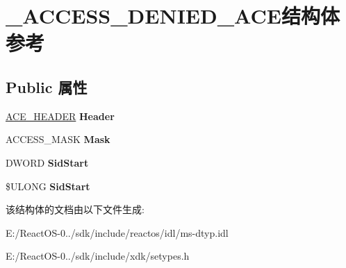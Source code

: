 \hypertarget{struct___a_c_c_e_s_s___d_e_n_i_e_d___a_c_e}{}\section{\+\_\+\+A\+C\+C\+E\+S\+S\+\_\+\+D\+E\+N\+I\+E\+D\+\_\+\+A\+C\+E结构体 参考}
\label{struct___a_c_c_e_s_s___d_e_n_i_e_d___a_c_e}
\subsection*{Public 属性}
\begin{DoxyCompactItemize}
\item 
\mbox{\label{struct___a_c_c_e_s_s___d_e_n_i_e_d___a_c_e_aa7c23bffe145af1dc4b7fca6fd3ef57d}} 
\hyperlink{struct___a_c_e___h_e_a_d_e_r}{A\+C\+E\+\_\+\+H\+E\+A\+D\+ER} {\bfseries Header}
\item 
\mbox{\label{struct___a_c_c_e_s_s___d_e_n_i_e_d___a_c_e_ad33d7ba86c5299f9c48a4507f53b3209}} 
A\+C\+C\+E\+S\+S\+\_\+\+M\+A\+SK {\bfseries Mask}
\item 
\mbox{\label{struct___a_c_c_e_s_s___d_e_n_i_e_d___a_c_e_aa77e87aaedac6ac5b6ff6837793916c9}} 
D\+W\+O\+RD {\bfseries Sid\+Start}
\item 
\mbox{\label{struct___a_c_c_e_s_s___d_e_n_i_e_d___a_c_e_ae59db97f2de2d45cc06be929d03562e8}} 
\$U\+L\+O\+NG {\bfseries Sid\+Start}
\end{DoxyCompactItemize}


该结构体的文档由以下文件生成\+:\begin{DoxyCompactItemize}
\item 
E\+:/\+React\+O\+S-\/0../sdk/include/reactos/idl/ms-\/dtyp.\+idl\item 
E\+:/\+React\+O\+S-\/0../sdk/include/xdk/setypes.\+h\end{DoxyCompactItemize}
